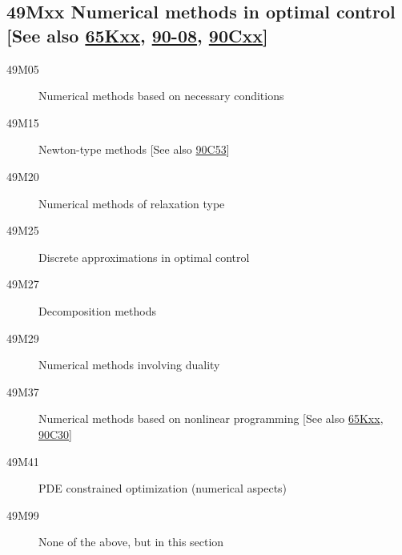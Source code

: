 \subsection*{49Mxx  Numerical methods in  optimal control [See also \hyperref[65Kxx]{65Kxx}, \hyperref[90-08]{90-08}, \hyperref[90Cxx]{90Cxx}] }\label{49Mxx}
\begin{description}  
\item [49M05]\label{49M05} Numerical methods based on necessary conditions
\item [49M15]\label{49M15} Newton-type methods [See also \hyperref[90C53]{90C53}]
\item [49M20]\label{49M20} Numerical methods of relaxation type 
\item [49M25]\label{49M25} Discrete approximations in optimal control
\item [49M27]\label{49M27} Decomposition methods 
\item [49M29]\label{49M29} Numerical methods involving duality 
\item [49M37]\label{49M37} Numerical methods based on nonlinear programming [See also \hyperref[65Kxx]{65Kxx}, \hyperref[90C30]{90C30}]
\item [49M41]\label{49M41} PDE constrained optimization (numerical aspects)
\item [49M99]\label{49M99} None of the above, but in this section
\end{description}
